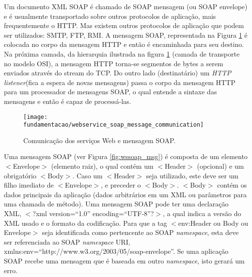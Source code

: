 Um documento XML SOAP é chamado de SOAP mensagem (ou SOAP envelope) e é usualmente transportado sobre outros protocolos de aplicação, mais frequentemente o HTTP. Mas existem outros protocolos de aplicação que podem ser utilizados: SMTP\footnotemark {}, FTP\footnotemark {}, RMI\footnotemark {}. A mensagem SOAP, representada na Figura \ref{fig:wsmodelsoap_communication_msg} é colocada no corpo da mensagem HTTP e então é encaminhada para seu destino. Na próxima camada, da hierarquia ilustrada na figura \ref{fig:wsmodelsoap_communication_msg} (camada de transporte no modelo OSI\footnotemark {}), a mensagem HTTP torna-se segmentos de bytes a serem enviados através do stream do TCP. Do outro lado (destinatário) um \textit{HTTP listener}(fica a espera de novas mensagens) passa o corpo da mensagem HTTP para um processador de mensagens SOAP, o qual entende a sintaxe das mensagens e então é capaz de processá-las.\cite{Papazoglou:2008}
 
\begin{figure}[!htb] \centering 
  \centering
  \texttt{[image: fundamentacao/webservice\_soap\_message\_communication]} 
  \caption{Comunicação dos serviços Web e mensagem SOAP.\cite{Papazoglou:2008}} 
  \label{fig:wsmodelsoap_communication_msg}
\end{figure}

Uma mensagem SOAP (ver Figura \ref{fig:wssoap_msg}) é composta de um elemento $<$Envelope$>$ (elemento raiz), o qual contém um $<$Header$>$ (opcional) e um obrigatório $<$Body$>$. Caso um $<$Header$>$ seja utilizado, este deve ser um filho imediato de $<$Envelope$>$, e preceder o $<$Body$>$. $<$Body$>$ contém os dados principais da aplicação (dados arbitrários em um XML ou parâmetros para uma chamada de método). Uma mensagem SOAP pode ter uma declaração XML, $<$?xml version=``1.0'' encoding=``UTF-8''?$>$, a qual indica a versão do XML usado e o formato da codificação. Para que a tag $<$env:Header ou Body ou Envelope$>$ seja identificada como pertencente ao SOAP \textit{namespace}, esta deve ser referenciada ao SOAP \textit{namespace} URI, xmlns:env=``http://www.w3.org/2003/05/soap-envelope''. Se uma aplicação SOAP recebe uma mensagem que é baseada em outro \textit{namespace}, isto gerará um erro.\cite{Papazoglou:2008}

